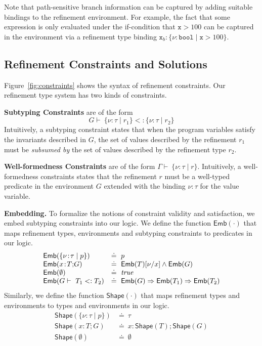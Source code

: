 \documentclass[nocopyrightspace]{sigplanconf}
\newcommand{\defeq}{\doteq\ }
\def\mypara#1{\smallskip\noindent\textbf{#1}}
\def\set#1{{\{ #1\}}}
\def\true{{\it true}}
\newcommand{\ttx}{\mathtt{x}}
\def\subt{<:}
\def\valu{\nu}
\newcommand{\ftyp}[2]{{{#1}\!:\!{#2}}}
\newcommand{\SUBST}[3]{{#1}[{#3}/{#2}]}
\newcommand{\EXT}[2]{{#1;\!#2}}
\newcommand{\tenv}{\Gamma}
\newcommand{\renv}{G}
\def\ttbool{\mathtt{bool}}
\newcommand{\typ}{\tau}
\newcommand{\tliqs}{T}
\newcommand{\shape}[1]{\mathsf{Shape}({#1})}
\newcommand{\embed}[1]{\mathsf{Emb}({#1})}
\newcommand{\reftyp}[3]{\set{\ftyp{{#1}}{{#2}} \mid {#3}}}
\newcommand{\deriv}{\vdash\ }
\begin{document}
Note that path-sensitive branch information can be captured by adding 
suitable bindings to the refinement environment. 
For example, the fact that some expression is only evaluated under 
the if-condition that $\ttx > 100$ can be captured in the
environment via a refinement type binding 
$\ftyp{\ttx_b}{\reftyp{\valu}{\ttbool}{\ttx > 100}}$.

\subsection{Refinement Constraints and Solutions}
\label{sec:refconstr}

Figure~\ref{fig:constraints} shows the syntax of refinement constraints.
Our refinement type system has two kinds of constraints. 


\mypara{Subtyping Constraints} are of the form
$${\renv \deriv \reftyp{\valu}{\typ}{r_1} \subt \reftyp{\valu}{\typ}{r_2}}$$
Intuitively, a subtyping constraint states that when the program variables satisfy
the invariants described in $\renv$, the set of values described by
the refinement $r_1$ must be \emph{subsumed by} 
the set of values described by the refinement type $r_2$.

\mypara{Well-formedness Constraints} are of the form 
${\tenv \deriv \reftyp{\valu}{\typ}{r}}$. 
Intuitively, a well-formedness constraints states that the refinement $r$
must be a well-typed predicate in the environment $\renv$ extended with the
binding $\ftyp{\valu}{\typ}$ for the value variable.


\mypara{Embedding.}
To formalize the notions of constraint validity and satisfaction, we embed subtyping
constraints into our logic. We define the function $\embed{\cdot}$ that maps
refinement types, environments and subtyping constraints to predicates in
our logic.
\begin{displaymath}
\begin{array}{ll}
\embed{\reftyp{\valu}{\typ}{p}} 	& \defeq p \\
\embed{\EXT{\ftyp{x}{\tliqs}}{\renv}} 	& \defeq \SUBST{\embed{\tliqs}}{x}{\valu} \wedge \embed{\renv} \\
\embed{\emptyset}			& \defeq \true \\
\embed{\renv \deriv \tliqs_1 \subt \tliqs_2} & \defeq \embed{\renv}
\Rightarrow \embed{\tliqs_1} \Rightarrow \embed{\tliqs_2}\\
\end{array}
\end{displaymath}
Similarly, we define the function $\shape{\cdot}$ that maps refinement
types and environments to types and environments in our logic.
\begin{displaymath}
\begin{array}{ll}
\shape{\reftyp{\valu}{\typ}{p}} 	& \defeq \typ \\
\shape{\EXT{\ftyp{x}{\tliqs}}{\renv}} 	& \defeq \EXT{\ftyp{x}{\shape{\tliqs}}}{\shape{\renv}}\\
\shape{\emptyset}			& \defeq \emptyset \\
\end{array}
\end{displaymath}
\end{document}
